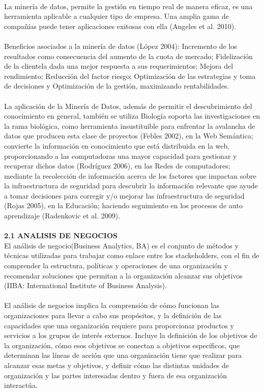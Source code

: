 \documentclass[a4paper,12pt,twocolumn]{article}
\begin{document}
\textbf{}\\
La minería de datos, permite la gestión en tiempo real de manera eficaz, es una herramienta aplicable a cualquier tipo de empresa. Una amplia gama de compañías puede tener aplicaciones exitosas con ella (Angeles et al. 2010). \textbf{}\\
\textbf{}\\
Beneficios asociados a la minería de datos (López 2004): Incremento de los resultados como consecuencia del aumento de la cuota de mercado; Fidelización de la clientela dada una mejor respuesta a sus requerimientos; Mejora del rendimiento; Reducción del factor riesgo; Optimización de las estrategias y toma de decisiones y Optimización de la gestión, maximizando rentabilidades. \textbf{}\\
\textbf{}\\
La aplicación de la Minería de Datos, además de permitir el descubrimiento del conocimiento en general, también se utiliza Biología soporta las investigaciones en la rama biológica, como herramienta insustituible para enfrentar la avalancha de datos que producen esta clase de proyectos (Febles 2002), en la Web Semántica; convierte la información en conocimiento que está distribuida en la web, proporcionando a las computadoras una mayor capacidad para gestionar y recuperar dichos datos (Rodríguez 2006), en las Redes de computadores; mediante la recolección de información acerca de los factores que impactan sobre la infraestructura de seguridad para descubrir la información relevante que ayude a tomar decisiones para corregir y/o mejorar las infraestructura de seguridad (Rojas 2005), en la Educación; haciendo seguimiento en los procesos de auto aprendizaje (Radenkovic et al. 2009).
\textbf{}\\
\textbf{}\\
\textbf{2.1 ANALISIS DE NEGOCIOS}
\textbf{}\\
El análisis de negocio(Business Analytics, BA) es el conjunto de métodos y técnicas utilizadas para trabajar como enlace entre los stackeholders, con el fin de comprender la estructura, políticas y operaciones de una organización y recomendar soluciones que permitan a la organización alcanzar sus objetivos (IIBA: International Institute of Business Analysis).\\
\textbf{}\\
El análisis de negocios implica la comprensión de cómo funcionan las organizaciones para llevar a cabo sus propósitos, y la definición de las capacidades que una organización requiere para proporcionar productos y servicios a los grupos de interés externos. Incluye la definición de los objetivos de la organización, cómo esos objetivos se conectan a objetivos específicos, que determinan las líneas de acción que una organización tiene que realizar para alcanzar esas metas y objetivos, y definir cómo las distintas unidades de organización y las partes interesadas dentro y fuera de esa organización interactúa.
\end{document}
